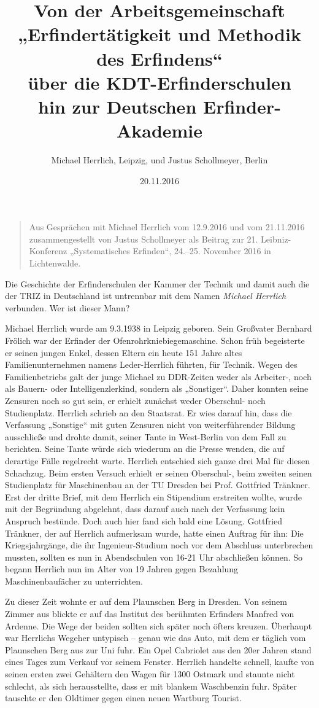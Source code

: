 \documentclass[11pt,a4paper]{article}
\title{Von der Arbeitsgemeinschaft\\ „Erfindertätigkeit und Methodik des
  Erfindens“\\ über die KDT-Erfinderschulen\\ hin zur Deutschen
  Erfinder-Akademie}
\author{Michael Herrlich, Leipzig, und Justus Schollmeyer, Berlin}
\date{20.11.2016}
\begin{document}
\maketitle
\begin{quote}
  Aus Gesprächen mit Michael Herrlich vom 12.9.2016 und vom 21.11.2016
  zusammengestellt von Justus Schollmeyer als Beitrag zur
  21. Leibniz-Konferenz „Systematisches Erfinden“, 24.--25. November 2016 in
  Lichtenwalde.
\end{quote}

Die Geschichte der Erfinderschulen der Kammer der Technik und damit auch die
der TRIZ in Deutschland ist untrennbar mit dem Namen \emph{Michael Herrlich}
verbunden.  Wer ist dieser Mann?

Michael Herrlich wurde am 9.3.1938 in Leipzig geboren. Sein Großvater Bernhard
Frölich war der Erfinder der Ofenrohrkniebiegemaschine. Schon früh begeisterte
er seinen jungen Enkel, dessen Eltern ein heute 151 Jahre altes
Familienunternehmen namens Leder-Herrlich führten, für Technik. Wegen des
Familienbetriebs galt der junge Michael zu DDR-Zeiten weder als Arbeiter-,
noch als Bauern- oder Intelligenzlerkind, sondern als „Sonstiger“. Daher
konnten seine Zensuren noch so gut sein, er erhielt zunächst weder Oberschul-
noch Studienplatz. Herrlich schrieb an den Staatsrat. Er wies darauf hin, dass
die Verfassung „Sonstige“ mit guten Zensuren nicht von weiterführender Bildung
ausschließe und drohte damit, seiner Tante in West-Berlin von dem Fall zu
berichten.  Seine Tante würde sich wiederum an die Presse wenden, die auf
derartige Fälle regelrecht warte. Herrlich entschied sich ganze drei Mal für
diesen Schachzug. Beim ersten Versuch erhielt er seinen Oberschul-, beim
zweiten seinen Studienplatz für Maschinenbau an der TU Dresden bei
Prof. Gottfried Tränkner. Erst der dritte Brief, mit dem Herrlich ein
Stipendium erstreiten wollte, wurde mit der Begründung abgelehnt, dass darauf
auch nach der Verfassung kein Anspruch bestünde. Doch auch hier fand sich bald
eine Lösung. Gottfried Tränkner, der auf Herrlich aufmerksam wurde, hatte
einen Auftrag für ihn: Die Kriegsjahrgänge, die ihr Ingenieur-Studium noch vor
dem Abschluss unterbrechen mussten, sollten es nun in Abendschulen von 16-21
Uhr abschließen können. So begann Herrlich nun im Alter von 19 Jahren gegen
Bezahlung Maschinenbaufächer zu unterrichten.

Zu dieser Zeit wohnte er auf dem Plaunschen Berg in Dresden. Von seinem Zimmer
aus blickte er auf das Institut des berühmten Erfinders Manfred von
Ardenne. Die Wege der beiden sollten sich später noch öfters
kreuzen. Überhaupt war Herrlichs Wegeher untypisch – genau wie das Auto, mit
dem er täglich vom Plaunschen Berg aus zur Uni fuhr. Ein Opel Cabriolet aus
den 20er Jahren stand eines Tages zum Verkauf vor seinem Fenster. Herrlich
handelte schnell, kaufte von seinen ersten zwei Gehältern den Wagen für 1300
Ostmark und staunte nicht schlecht, als sich herausstellte, dass er mit
blankem Waschbenzin fuhr. Später tauschte er den Oldtimer gegen einen neuen
Wartburg Tourist.
\end{document}

